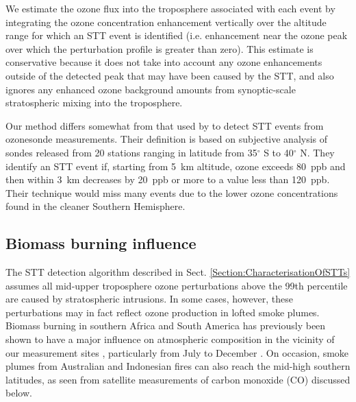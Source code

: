     We estimate the ozone flux into the troposphere associated with each event by integrating the ozone concentration enhancement vertically over the altitude range for which an STT event is identified (i.e. enhancement near the ozone peak over which the perturbation profile is greater than zero).
    This estimate is conservative because it does not take into account any ozone enhancements outside of the detected peak that may have been caused by the STT, and also ignores any enhanced ozone background amounts from synoptic-scale stratospheric mixing into the troposphere.
    
    Our method differs somewhat from that used by \citet{Tang2010} to detect STT events from ozonesonde measurements. 
    Their definition is based on subjective analysis of sondes released from 20 stations ranging in latitude from 35$^\circ$ S to 40$^\circ$ N.
    They identify an STT event if, starting from 5~km altitude, ozone exceeds 80~ppb and then within 3~km decreases by 20~ppb or more to a value less than 120~ppb.
    Their technique would miss many events due to the lower ozone concentrations found in the cleaner Southern Hemisphere.

  \subsection{Biomass burning influence}
  \label{Section:BiomassBurning}
    The STT detection algorithm described in Sect. \ref{Section:CharacterisationOfSTTs} assumes all mid-upper troposphere ozone perturbations above the 99th percentile are caused by stratospheric intrusions. 
    In some cases, however, these perturbations may in fact reflect ozone production in lofted smoke plumes.
    Biomass burning in southern Africa and South America has previously been shown to have a major influence on atmospheric composition in the vicinity of our measurement sites \citep{Oltmans2001, Gloudemans2006, Edwards2006}, particularly from July to December \citep{Pak2003, Liu2016}.
    On occasion, smoke plumes from Australian and Indonesian fires can also reach the mid-high southern latitudes, as seen from satellite measurements of carbon monoxide (CO) discussed below. %
    
